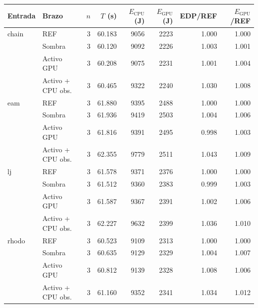 \begin{tabular}{@{}llrrrrrr@{}}
\toprule
\textbf{Entrada} & \textbf{Brazo} & \textbf{$n$} & \textbf{$T$ (s)} & \textbf{$E_{\mathrm{CPU}}$ (J)} & \textbf{$E_{\mathrm{GPU}}$ (J)} & \textbf{EDP/REF} & \textbf{$E_{\mathrm{GPU}}$/REF} \\
\midrule
chain & REF & 3 & 60.183 & 9056 & 2223 & 1.000 & 1.000 \\
 & Sombra & 3 & 60.120 & 9092 & 2226 & 1.003 & 1.001 \\
 & Activo GPU & 3 & 60.208 & 9075 & 2231 & 1.001 & 1.004 \\
 & Activo + CPU obs. & 3 & 60.465 & 9322 & 2240 & 1.030 & 1.008 \\
\midrule
eam & REF & 3 & 61.880 & 9395 & 2488 & 1.000 & 1.000 \\
 & Sombra & 3 & 61.936 & 9419 & 2503 & 1.004 & 1.006 \\
 & Activo GPU & 3 & 61.816 & 9391 & 2495 & 0.998 & 1.003 \\
 & Activo + CPU obs. & 3 & 62.355 & 9779 & 2511 & 1.043 & 1.009 \\
\midrule
lj & REF & 3 & 61.578 & 9371 & 2376 & 1.000 & 1.000 \\
 & Sombra & 3 & 61.512 & 9360 & 2383 & 0.999 & 1.003 \\
 & Activo GPU & 3 & 61.587 & 9367 & 2391 & 1.002 & 1.006 \\
 & Activo + CPU obs. & 3 & 62.227 & 9632 & 2399 & 1.036 & 1.010 \\
\midrule
rhodo & REF & 3 & 60.523 & 9109 & 2313 & 1.000 & 1.000 \\
 & Sombra & 3 & 60.635 & 9129 & 2329 & 1.004 & 1.007 \\
 & Activo GPU & 3 & 60.812 & 9139 & 2328 & 1.008 & 1.006 \\
 & Activo + CPU obs. & 3 & 61.160 & 9352 & 2341 & 1.034 & 1.012 \\
\bottomrule
\end{tabular}
